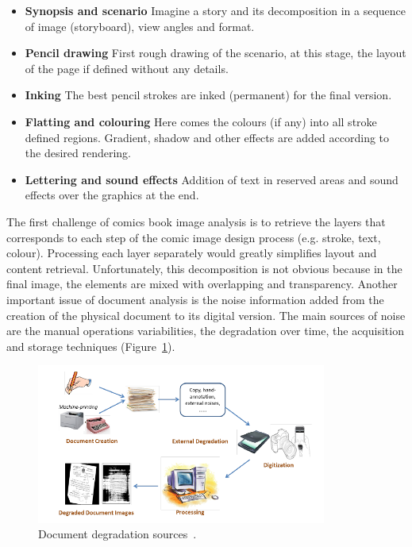 \begin{itemize}
  \item \textbf{Synopsis and scenario} Imagine a story and its decomposition in a sequence of image (storyboard), view angles and format. 
  \item \textbf{Pencil drawing} First rough drawing of the scenario, at this stage, the layout of the page if defined without any details.
  \item \textbf{Inking} The best pencil strokes are inked (permanent) for the final version.
  \item \textbf{Flatting and colouring} Here comes the colours (if any) into all stroke defined regions. Gradient, shadow and other effects are added according to the desired rendering.
  \item \textbf{Lettering and sound effects} Addition of text in reserved areas and sound effects over the graphics at the end.
\end{itemize}

The first challenge of comics book image analysis is to retrieve the layers that corresponds to each step of the comic image design process (e.g. stroke, text, colour).
Processing each layer separately would greatly simplifies layout and content retrieval.
Unfortunately, this decomposition is not obvious because in the final image, the elements are mixed with overlapping and transparency.
Another important issue of document analysis is the noise information added from the creation of the physical document to its digital version.
The main sources of noise are the manual operations variabilities, the degradation over time, the acquisition and storage techniques (Figure~\ref{fig:sota:document_degradation}).


    \begin{figure}[!ht]%
      \centering
      \includegraphics[width=0.85\textwidth]{document_degradation.png}
    \caption[Document degradation sources]{Document degradation sources~\cite{Peng2013Document}.}
    \label{fig:sota:document_degradation}
    \end{figure}


